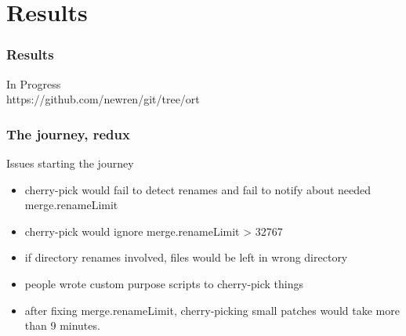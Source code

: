 \documentclass[compress,t]{beamer}
\begin{document}
\section[Results]{Results}

\begin{frame}
  \frametitle{Results}

  \vfill
  \begin{center}
    In Progress\\[2em]

    https://github.com/newren/git/tree/ort
  \end{center}
  \vfill

\end{frame}


\begin{frame}
  \frametitle{The journey, redux}

  \vspace*{-0.5\baselineskip}
  \begin{minipage}{0.88\textwidth}
  \begin{block}{Issues starting the journey}
    {\footnotesize
    \begin{itemize}
      \item cherry-pick would fail to detect renames and fail to notify
            about needed merge.renameLimit
      \item cherry-pick would ignore merge.renameLimit > 32767
      \item if directory renames involved, files would be left in wrong
            directory
      \item people wrote custom purpose scripts to cherry-pick things
      \item after fixing merge.renameLimit, cherry-picking small patches
            would take more than 9 minutes.
    \end{itemize}
    }
  \end{block}
  \end{minipage}

  \vspace*{\baselineskip}
  {\small
  }

\end{frame}

\end{document}
